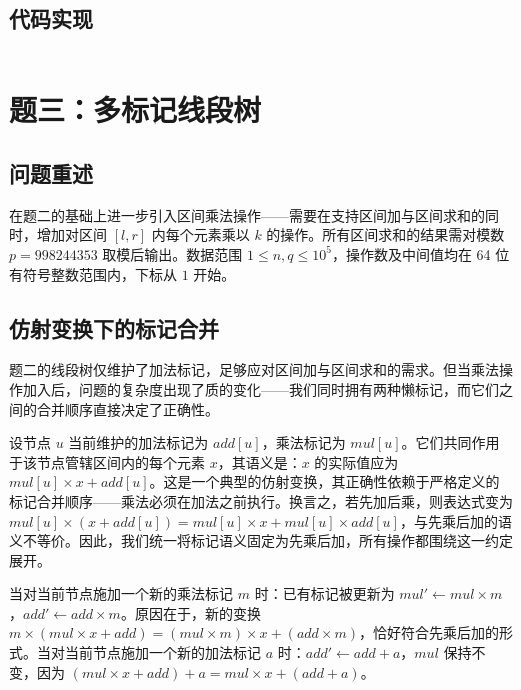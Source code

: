 \documentclass[12pt, a4paper]{academics}
\begin{document}
\subsection{代码实现}

\inputminted{c++}{../src/p2_segtree_lazy.cpp}

\section{题三：多标记线段树}

\subsection{问题重述}

在题二的基础上进一步引入区间乘法操作——需要在支持区间加与区间求和的同时，增加对区间 $[l, r]$ 内每个元素乘以 $k$ 的操作。所有区间求和的结果需对模数 $p = 998244353$ 取模后输出。数据范围 $1 \le n, q \le 10^5$，操作数及中间值均在 64 位有符号整数范围内，下标从 $1$ 开始。

\subsection{仿射变换下的标记合并}

题二的线段树仅维护了加法标记，足够应对区间加与区间求和的需求。但当乘法操作加入后，问题的复杂度出现了质的变化——我们同时拥有两种懒标记，而它们之间的合并顺序直接决定了正确性。

设节点 $u$ 当前维护的加法标记为 $\mathit{add}[u]$，乘法标记为 $\mathit{mul}[u]$。它们共同作用于该节点管辖区间内的每个元素 $x$，其语义是：$x$ 的实际值应为 $\mathit{mul}[u] \times x + \mathit{add}[u]$。这是一个典型的仿射变换，其正确性依赖于严格定义的标记合并顺序——乘法必须在加法之前执行。换言之，若先加后乘，则表达式变为 $\mathit{mul}[u] \times (x + \mathit{add}[u]) = \mathit{mul}[u] \times x + \mathit{mul}[u] \times \mathit{add}[u]$，与先乘后加的语义不等价。因此，我们统一将标记语义固定为先乘后加，所有操作都围绕这一约定展开。

当对当前节点施加一个新的乘法标记 $m$ 时：已有标记被更新为 $\mathit{mul}' \gets \mathit{mul} \times m$，$\mathit{add}' \gets \mathit{add} \times m$。原因在于，新的变换 $m \times (\mathit{mul} \times x + \mathit{add}) = (\mathit{mul} \times m) \times x + (\mathit{add} \times m)$，恰好符合先乘后加的形式。当对当前节点施加一个新的加法标记 $a$ 时：$\mathit{add}' \gets \mathit{add} + a$，$\mathit{mul}$ 保持不变，因为 $(\mathit{mul} \times x + \mathit{add}) + a = \mathit{mul} \times x + (\mathit{add} + a)$。
\end{document}
